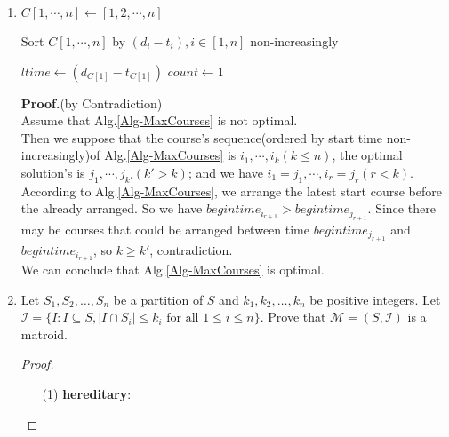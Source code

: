 \documentclass[12pt,a4paper]{article}
\makeatletter
\newtheorem*{solution}{Solution}
\theoremstyle{definition}
\renewenvironment{solution}[1][Solution] {\par\pushQED{\qed}\normalfont\topsep6\p@\@plus6\p@\relax\trivlist\item[\hskip\labelsep\bfseries#1\@addpunct{.}]\ignorespaces}{\popQED\endtrivlist\@endpefalse} \makeatother
\makeatother
\begin{document}
\begin{enumerate}
\begin{solution}
\begin{minipage}[t]{0.90\textwidth}
\begin{algorithm}[H]
        		$C[1,\cdots,n] \leftarrow [1,2,\cdots,n]$\;
        		
        		Sort $C[1,\cdots,n]$ by $ (d_i - t_i),i\in[1,n]$ non-increasingly\;
        		
        		$ ltime \leftarrow (d_{C[1]} - t_{C[1]})$\;
        		$ count\leftarrow1$\;
        		
        		
        	
        		\;
        	\end{algorithm}
        \end{minipage}
    
    	\textbf{Proof.}(by Contradiction)\\
    	Assume that Alg.\ref{Alg-MaxCourses} is not optimal.\\
    	Then we suppose that the course's sequence(ordered by start time non-increasingly)of Alg.\ref{Alg-MaxCourses} is $ i_1,\cdots,i_k(k\leq n) $, the optimal solution's is $ j_1,\cdots,j_{k'}(k'>k)$; and we have $ i_1 = j_1,\cdots,i_r = j_r(r < k)$.\\
    	According to Alg.\ref{Alg-MaxCourses}, we arrange the latest start course before the already arranged. So we have $ begintime_{i_{r+1}} > begintime_{j_{r+1}} $. Since there may be courses that could be arranged between time $ begintime_{j_{r+1}} $ and $ begintime_{i_{r+1}} $, so $ k \geq k'$, contradiction.\\
    	We can conclude that Alg.\ref{Alg-MaxCourses} is optimal.
    \end{solution}

    \item
    Let $S_1,S_2,\dots,S_n$ be a partition of $S$ and $k_1,k_2,\dots,k_n$ be positive integers. Let $\mathcal{I}=\{I: I \subseteq S,|I \cap S_i| \leq k_i \text { for all } 1 \leq i \leq n\}$. Prove that $\mathcal{M}=(S,\mathcal{I})$ is a matroid.

    \begin{proof}\hspace*{\fill}
        \begin{enumerate}
        	\item[(1)] \textbf{hereditary}:
        	

\end{enumerate}
\end{proof}
\end{enumerate}
\end{document}
